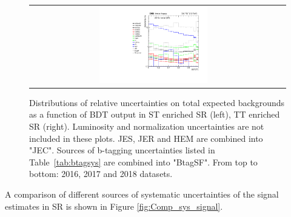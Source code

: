 \begin{figure}[tbh!]
\begin{center}
\begin{tabular}{cc}
  \includegraphics[width=0.45\textwidth]{figures/Part3/Systematics/sysBDT_TT_bkg_2018} \\
 \end{tabular}
 \caption{Distributions of relative uncertainties on total expected backgrounds as a function of BDT output in ST enriched SR (left), TT enriched SR (right). Luminosity and normalization uncertainties are not included in these plots. JES, JER and HEM are combined into "JEC". Sources of b-tagging uncertainties listed in Table~\ref{tab:btagsys} are combined into "BtagSF". From top to bottom: 2016, 2017 and 2018 datasets.}
 \label{fig:Comp_sys_background}
 \end{center}
\end{figure}

 A comparison of different sources of systematic uncertainties of the signal estimates in SR is shown in Figure \ref{fig:Comp_sys_signal}.

